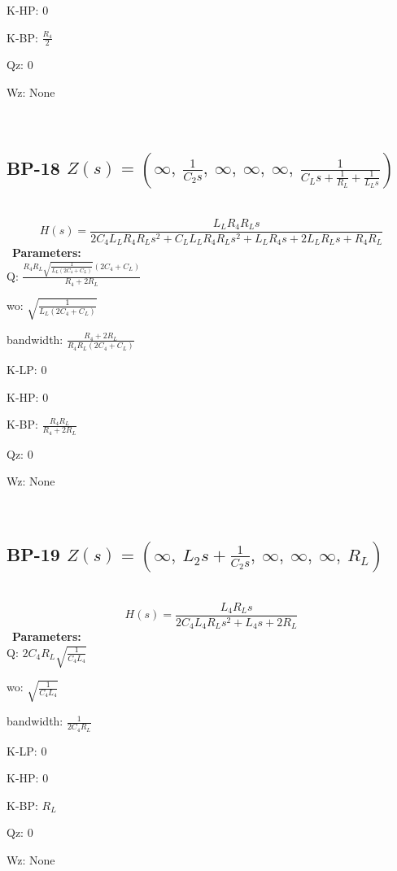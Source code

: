 \documentclass{article}
\begin{document}
K-HP: $0$\ 

K-BP: $\frac{R_{4}}{2}$\ 

Qz: $0$\ 

Wz: $\text{None}$\ 

\ 

\subsection{BP-18 $Z(s) = \left( \infty, \  \frac{1}{C_{2} s}, \  \infty, \  \infty, \  \infty, \  \frac{1}{C_{L} s + \frac{1}{R_{L}} + \frac{1}{L_{L} s}}\right)$ } \ 
\textbf{\[H(s) = \frac{L_{L} R_{4} R_{L} s}{2 C_{4} L_{L} R_{4} R_{L} s^{2} + C_{L} L_{L} R_{4} R_{L} s^{2} + L_{L} R_{4} s + 2 L_{L} R_{L} s + R_{4} R_{L}}\] } \ 
\textbf{Parameters:}\\ 

Q: $\frac{R_{4} R_{L} \sqrt{\frac{1}{L_{L} \left(2 C_{4} + C_{L}\right)}} \left(2 C_{4} + C_{L}\right)}{R_{4} + 2 R_{L}}$\ 

wo: $\sqrt{\frac{1}{L_{L} \left(2 C_{4} + C_{L}\right)}}$\ 

bandwidth: $\frac{R_{4} + 2 R_{L}}{R_{4} R_{L} \left(2 C_{4} + C_{L}\right)}$\ 

K-LP: $0$\ 

K-HP: $0$\ 

K-BP: $\frac{R_{4} R_{L}}{R_{4} + 2 R_{L}}$\ 

Qz: $0$\ 

Wz: $\text{None}$\ 

\ 

\subsection{BP-19 $Z(s) = \left( \infty, \  L_{2} s + \frac{1}{C_{2} s}, \  \infty, \  \infty, \  \infty, \  R_{L}\right)$ } \ 
\textbf{\[H(s) = \frac{L_{4} R_{L} s}{2 C_{4} L_{4} R_{L} s^{2} + L_{4} s + 2 R_{L}}\] } \ 
\textbf{Parameters:}\\ 

Q: $2 C_{4} R_{L} \sqrt{\frac{1}{C_{4} L_{4}}}$\ 

wo: $\sqrt{\frac{1}{C_{4} L_{4}}}$\ 

bandwidth: $\frac{1}{2 C_{4} R_{L}}$\ 

K-LP: $0$\ 

K-HP: $0$\ 

K-BP: $R_{L}$\ 

Qz: $0$\ 

Wz: $\text{None}$\ 
\end{document}
